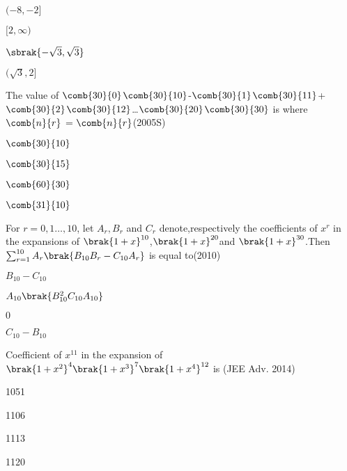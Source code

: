 \begin{enumerate}
\begin{multicols}{2}
    \item $(-8,-2]$
    \item $[2,\infty)$
    \item$\sbrak{-\sqrt{3},\sqrt{3}}$
    \item$(\sqrt{3},2]$
    \end{multicols}
\end{enumerate}

\item The value of
	$\comb{30}{0}$$\comb{30}{10}$-$\comb{30}{1}$$\comb{30}{11}$+$\comb{30}{2}$$\comb{30}{12}$\dots$\comb{30}{20}$$\comb{30}{30}$ is where $\comb{n}{r}$ = $\comb{n}{r}$\hfill(2005S)
\begin{enumerate}
\begin{multicols}{2}
\item$\comb{30}{10}$ 
\item$\comb{30}{15}$
\item$\comb{60}{30}$ 
\item$\comb{31}{10}$
\end{multicols}
\end{enumerate}
\item For $r=0,1\dots,10$, let $A_r,B_r$ and $C_r$ denote,respectively the coefficients of $x^r$ in the expansions of $\brak{1+x}^{10}$,$\brak{1+x}^{20}$and $\brak{1+x}^{30}$.Then $\sum_{r=1}^{10}A_r\brak{B_{10}B_r-C_{10}A_r}$ is equal to\hfill(2010)
\begin{enumerate}
 \begin{multicols}{2}
 \item $B_{10}-C_{10}$ 
 \item $A_{10}\brak{B_{10}^2C_{10}A_{10}}$ 
 \item $0$
 \item $C_{10}-B_{10}$
 \end{multicols}
\end{enumerate}

\item  Coefficient of $x^{11}$ in the expansion of $ \brak{1+x^2}^4 \brak{1+x^3}^7 \brak{1+x^4}^{12}$ is \hfill(JEE Adv. 2014)

\begin{enumerate}
\begin{multicols}{2}
 \item 1051
 \item 1106
 \item 1113
 \item 1120
 \end{multicols}
\end{enumerate}





